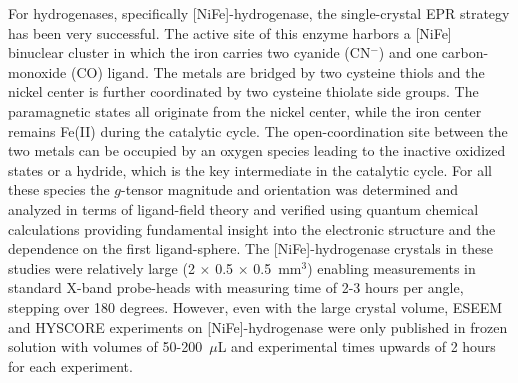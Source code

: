 For hydrogenases, specifically [NiFe]-hydrogenase, the single-crystal EPR strategy has been very successful. \cite{NiFe1996,NiFe2000, NiFe2003, NiFeRev2007} The active site of this enzyme harbors a [NiFe] binuclear cluster in which the iron carries two cyanide (CN$^-$) and one carbon-monoxide (CO) ligand. The metals are bridged by two cysteine thiols and the nickel center is further coordinated by two cysteine thiolate side groups. The paramagnetic states all originate from the nickel center, while the iron center remains Fe(II) during the catalytic cycle. \cite{lubitzhyd} The open-coordination site between the two metals can be occupied by an oxygen species leading to the inactive oxidized states or a hydride, which is the key intermediate in the catalytic cycle. \cite{NiFeRev2007} For all these species the $g$-tensor magnitude and orientation was determined and analyzed in terms of ligand-field theory and verified using quantum chemical calculations providing fundamental insight into the electronic structure and the dependence on the first ligand-sphere. \cite{Ping2005, Gasteljp0573902, NiFeRev2007, LubitzNiFe2016} The [NiFe]-hydrogenase crystals in these studies were relatively large (2 $\times$ 0.5 $\times$ 0.5~mm$^3$) enabling measurements in standard X-band probe-heads with measuring time of 2-3 hours per angle, stepping over 180 degrees. However, even with the large crystal volume, ESEEM and HYSCORE experiments on [NiFe]-hydrogenase were only published in frozen solution with volumes of 50-200~$\mu$L and experimental times upwards of 2 hours for each experiment. \cite{NiFeRev2007} 

